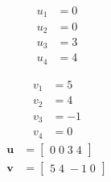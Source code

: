 \[\begin{aligned}
u_{1} &= 0 \\
u_{2} &= 0 \\
u_{3} &= 3 \\
u_{4} &= 4 
\end{aligned}\]

\[\begin{aligned}
v_{1} &= 5 \\
v_{2} &= 4 \\
v_{3} &= -1 \\
v_{4} &= 0 
\end{aligned}\]
\[\begin{aligned}
\mathbf{u} &= \begin{bmatrix}0\;0\;3\;4\end{bmatrix} \\
\mathbf{v} &= \begin{bmatrix}5\;4\;-1\;0\end{bmatrix}
\end{aligned}\]

